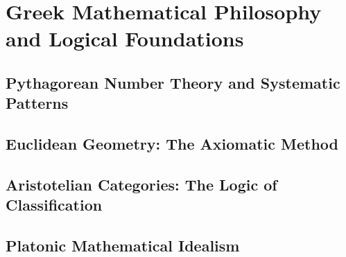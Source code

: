 
\chapter{Greek Mathematical Philosophy and Logical Foundations}

\section{Pythagorean Number Theory and Systematic Patterns}

\section{Euclidean Geometry: The Axiomatic Method}

\section{Aristotelian Categories: The Logic of Classification}

\section{Platonic Mathematical Idealism}
